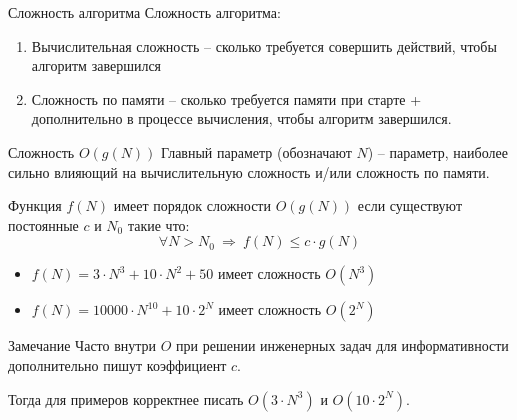 \begin{frame}{Сложность алгоритма}
	Сложность алгоритма:
	\begin{enumerate}
		\item Вычислительная сложность -- сколько требуется совершить действий, чтобы алгоритм завершился
		\item Сложность по памяти -- сколько требуется памяти при старте + дополнительно в процессе вычисления, чтобы алгоритм завершился.
	\end{enumerate}
	
	

\end{frame}



\begin{frame}{Сложность $O(g(N))$}
	\footnotesize
	{Главный параметр} (обозначают $N$) -- параметр, наиболее сильно влияющий на вычислительную сложность 
	и/или сложность по памяти.
	
	
	Функция $f(N)$ имеет порядок сложности $O(g(N))$ 
	если существуют постоянные $c$ и $N_0$ такие что:
	\begin{equation}
	\forall N > N_0  ~\Longrightarrow~ f(N)  \leqslant c \cdot g(N)
	\end{equation}
	
	\begin{itemize}
		\item $f(N)=3 \cdot N^3 + 10 \cdot N^2 + 50$ имеет сложность $O(N^3)$
		\item $f(N)=10000 \cdot N^{10} + 10 \cdot 2^N$ имеет сложность $O(2^N)$
	\end{itemize}

	\begin{block}{Замечание}
		Часто внутри $O$ при решении инженерных задач
		для информативности дополнительно пишут коэффициент $c$.
		
		Тогда для примеров корректнее писать $O(3 \cdot N^3)$ и $O(10 \cdot 2^N)$.
	\end{block}
\end{frame}

